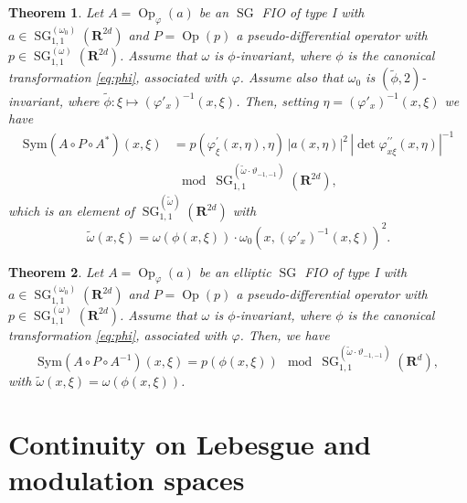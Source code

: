 \documentclass[12pt,a4paper,reqno]{amsart}
\numberwithin{equation}{section}
\newtheorem{thm}{Theorem}
\numberwithin{thm}{section}
\theoremstyle{definition}
\theoremstyle{remark}
\begin{document}
\begin{thm}
\label{thm:3.21}
Let $A = {\operatorname{Op}}_{\varphi}(a)$ be an ${\operatorname{SG}}$ FIO of type I with
$a \in {\operatorname{SG}}^{(\omega_0)}_{1,1}({\mathbf R^{{2d}}})$ and $P = {\operatorname{Op}({p})}$  a pseudo-differential operator with
$p \in {\operatorname{SG}}^{(\omega)}_{1,1}({\mathbf R^{{2d}}})$. Assume that $\omega$ is $\phi$-invariant,
where $\phi$ is the canonical transformation \eqref{eq:phi}, associated with $\varphi$. Assume
also that $\omega_0$ is $(\tilde{\phi},2)$-invariant, where $\tilde{\phi}\colon\xi\mapsto(\varphi '_{x})^{-1}(x,\xi)$.
Then, setting $\eta = (\varphi '_{x})^{-1}(x,\xi)$ we have
\begin{equation}
\label{eq:3.72.3bis}
\begin{aligned}
{\mathrm{Sym}\left({A\circ P\circ A^{*}}\right)}(x,\xi) &= p( \varphi^\prime_{\xi}(x, \eta), \eta)\,|a(x,\eta)|^2\,
|\det \varphi^{\prime\prime}_{x\xi}(x,\eta)|^{-1}
\\
& \mod {\operatorname{SG}}^{(\widetilde{\omega}\cdot\vartheta_{-1,-1})}_{1,1}({\mathbf R^{{2d}}}),
\end{aligned}
\end{equation}
which is an element of ${\operatorname{SG}}^{(\widetilde{\omega})}_{1,1}({\mathbf R^{{2d}}})$ with 
\[
	\widetilde{\omega}(x,\xi)=\omega(\phi(x,\xi))\cdot
	\omega_0(x,(\varphi '_{x})^{-1}(x,\xi))^2.
\]
\end{thm}
\begin{thm}
\label{thm:3.21ell}
Let $A = {\operatorname{Op}}_{\varphi}(a)$ be an elliptic ${\operatorname{SG}}$ FIO of type I with
$a \in {\operatorname{SG}}^{(\omega_0)}_{1,1}({\mathbf R^{{2d}}})$ and $P = {\operatorname{Op}({p})}$  a pseudo-differential operator with
$p \in {\operatorname{SG}}^{(\omega)}_{1,1}({\mathbf R^{{2d}}})$. Assume that $\omega$ is $\phi$-invariant,
where $\phi$ is the canonical transformation \eqref{eq:phi}, associated with 
$\varphi$. Then,  we have
\begin{equation}
\label{eq:3.72.3}
{\mathrm{Sym}\left({A\circ P\circ A^{-1}}\right)}(x,\xi) = p( \phi(x,\xi)) \!\!\mod 
{\operatorname{SG}}^{(\widetilde{\omega}\cdot\vartheta_{-1,-1})}_{1,1}({\mathbf R^{{d}}}),
\end{equation}
with $\widetilde{\omega}(x,\xi)=\omega(\phi(x,\xi))$.
\end{thm}

\section{Continuity on Lebesgue and modulation spaces}\label{sec3}
\end{document}
